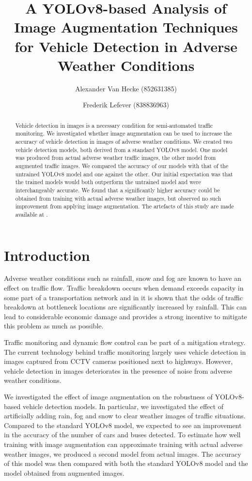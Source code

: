 \documentclass[]{article}
\title{A YOLOv8-based Analysis of Image Augmentation Techniques for Vehicle Detection in Adverse Weather Conditions}
\author{
		Alexander Van Hecke \small(852631385) \and 
		Frederik Lefever    \small(838836963)}
\begin{document}
\maketitle

\begin{abstract}
	Vehicle detection in images is a necessary condition for semi-automated traffic monitoring.  We investigated whether image augmentation can be used to increase the accuracy of vehicle detection in images of adverse weather conditions. We created two vehicle detection models, both derived from a standard YOLO\small{v8} model. One model was produced from actual adverse weather traffic images, the other model from augmented traffic images. We compared the accuracy of our models with that of the untrained  YOLO\small{v8} model and one against the other. Our initial expectation was that the trained models would both outperform the untrained model and were interchangeably accurate. We found that a significantly higher accuracy could be obtained from training with actual adverse weather images, but observed no such improvement from applying image augmentation. The artefacts of this study are made available at \cite{Van_Hecke_YOLOv8-based_Analysis_of_2024}.
\end{abstract}

\section{Introduction}

	Adverse weather conditions such as rainfall, snow and fog are known to have an effect on traffic flow. Traffic breakdown occurs when demand exceeds capacity in some part of a transportation network and in \cite{stralenInfluenceAdverseWeather2015} it is shown that the odds of traffic breakdown at bottleneck locations are significantly increased by rainfall.  This can lead to considerable economic damage and provides a strong incentive to mitigate this problem as much as possible.
	
	Traffic monitoring and dynamic flow control can be part of a mitigation strategy. The current technology behind traffic monitoring largely uses vehicle detection in images captured from CCTV cameras positioned next to highways. However, vehicle detection in images deteriorates in the presence of noise from adverse weather conditions.
	
	We investigated the effect of image augmentation on the robustness of YOLO{\small v8}-based vehicle detection models. In particular, we investigated the effect of artificially adding rain, fog and snow to clear weather images of traffic situations. Compared to the standard YOLO{\small v8} model, we expected to see an improvement in the accuracy of the number of cars and buses detected. To estimate how well training with image augmentation can approximate training with actual adverse weather images, we produced a second model from actual images. The accuracy of this model was then compared with both the standard YOLO{\small v8} model and the model obtained from augmented images.
	
\end{document}
